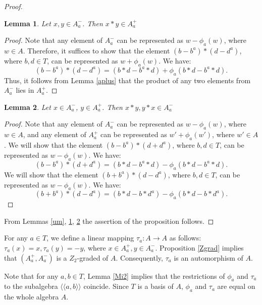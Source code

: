 \documentclass[12pt]{article}
\newcommand\la{\langle}
\newcommand\ra{\rangle}
\newcommand\lla{\la\!\la}
\newcommand\rra{\ra\!\ra}
\newtheorem{lem}{Lemma}
\begin{document}
\begin{proof}
\begin{lem}\label{dois}
Let $x,y\in A_a^-$. Then $x*y\in A_a^+$
\end{lem}	
\begin{proof}
	Note that any element of $A_a^-$ can be represented as $w-\phi_a(w)$, where $w\in A$. Therefore, it suffices to show that the element $(b-b^a)*(d-d^a)$, where $b,d\in T$, can be represented as $w+\phi_a(w)$. We have: $$(b-b^a)*(d-d^a)=(b*d-b^a*d)+\phi_a(b*d-b^a*d).$$ Thus, it follows from Lemma \ref{aplus} that the product of any two elements from $A_a^-$ lies in $A_a^+$.
	
\end{proof}

\begin{lem}\label{treis}
Let $x\in A_a^-$, $y\in A_a^+$. Then $x*y, y*x\in A_a^-$
\end{lem}	
\begin{proof}
Note that any element of $A_a^-$ can be represented as $w-\phi_a(w)$, where $w\in A$, and any element of $A_a^+$ can be represented as $w'+\phi_a(w')$, where $w'\in A$. We will show that the element $(b-b^a)*(d+d^a)$, where $b,d\in T$, can be represented as $w-\phi_a(w)$. We have: $$(b-b^a)*(d+d^a)=(b*d-b^a*d)-\phi_a(b*d-b^a*d).$$
We will show that the element $(b+b^a)*(d-d^a)$, where $b,d\in T$, can be represented as $w-\phi_a(w)$. We have: $$(b+b^a)*(d-d^a)=(b*d-b*d^a)-\phi_a(b*d-b*d^a).$$
\end{proof}

From Lemmas \ref{um}, \ref{dois}, \ref{treis} the assertion of the proposition follows.

\end{proof}

For any $a\in T$, we define a linear mapping $\tau_a: A\rightarrow A$ as follows: $\tau_a(x)=x, \tau_a(y)=-y$, where $x\in A_a^+, y\in A_a^-$.
Proposition \ref{Zgrad} implies that $(A_a^+,A_a^-)$ is a $Z_2$-graded of $A$. Consequently, $\tau_a$ is an automorphism of $A$.

Note that for any $a,b\in T$, Lemma \ref{Mi2} implies that the restrictions of $\phi_a$ and $\tau_a$ to the subalgebra $\lla a,b\rra$ coincide. Since $T$ is a basis of $A$, $\phi_a$ and $\tau_a$ are equal on the whole algebra $A$.
\end{document}
